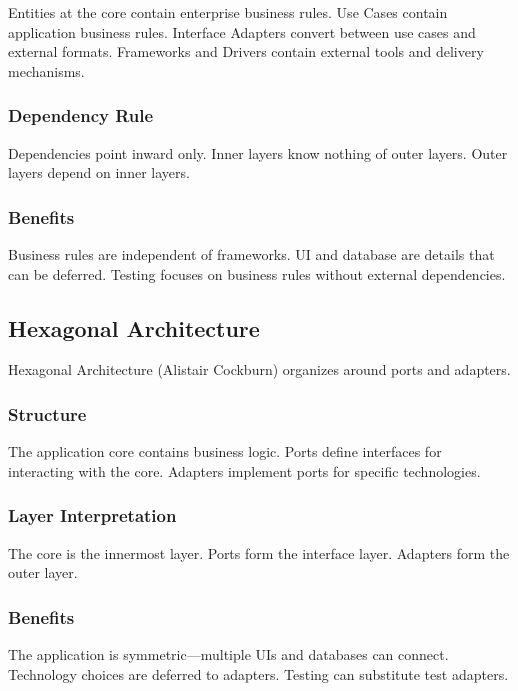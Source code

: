 \documentclass[11pt]{article}
\begin{document}
Entities at the core contain enterprise business rules. Use Cases contain application business rules. Interface Adapters convert between use cases and external formats. Frameworks and Drivers contain external tools and delivery mechanisms.

\subsubsection{Dependency Rule}

Dependencies point inward only. Inner layers know nothing of outer layers. Outer layers depend on inner layers.

\subsubsection{Benefits}

Business rules are independent of frameworks. UI and database are details that can be deferred. Testing focuses on business rules without external dependencies.

\subsection{Hexagonal Architecture}

Hexagonal Architecture (Alistair Cockburn) organizes around ports and adapters.

\subsubsection{Structure}

The application core contains business logic. Ports define interfaces for interacting with the core. Adapters implement ports for specific technologies.

\subsubsection{Layer Interpretation}

The core is the innermost layer. Ports form the interface layer. Adapters form the outer layer.

\subsubsection{Benefits}

The application is symmetric---multiple UIs and databases can connect. Technology choices are deferred to adapters. Testing can substitute test adapters.
\end{document}
